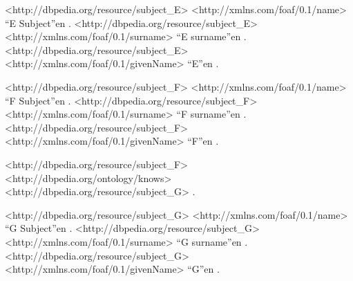 \begin{listing}
<http://dbpedia.org/resource/subject_E> <http://xmlns.com/foaf/0.1/name> ``E Subject''en .
<http://dbpedia.org/resource/subject_E> <http://xmlns.com/foaf/0.1/surname> ``E surname''en .
<http://dbpedia.org/resource/subject_E> <http://xmlns.com/foaf/0.1/givenName> ``E''en .

<http://dbpedia.org/resource/subject_F> <http://xmlns.com/foaf/0.1/name> ``F Subject''en .
<http://dbpedia.org/resource/subject_F> <http://xmlns.com/foaf/0.1/surname> ``F surname''en .
<http://dbpedia.org/resource/subject_F> <http://xmlns.com/foaf/0.1/givenName> ``F''en .

<http://dbpedia.org/resource/subject_F> <http://dbpedia.org/ontology/knows> <http://dbpedia.org/resource/subject_G> .

<http://dbpedia.org/resource/subject_G> <http://xmlns.com/foaf/0.1/name> ``G Subject''en .
<http://dbpedia.org/resource/subject_G> <http://xmlns.com/foaf/0.1/surname> ``G surname''en .
<http://dbpedia.org/resource/subject_G> <http://xmlns.com/foaf/0.1/givenName> ``G''en .
\end{listing}
